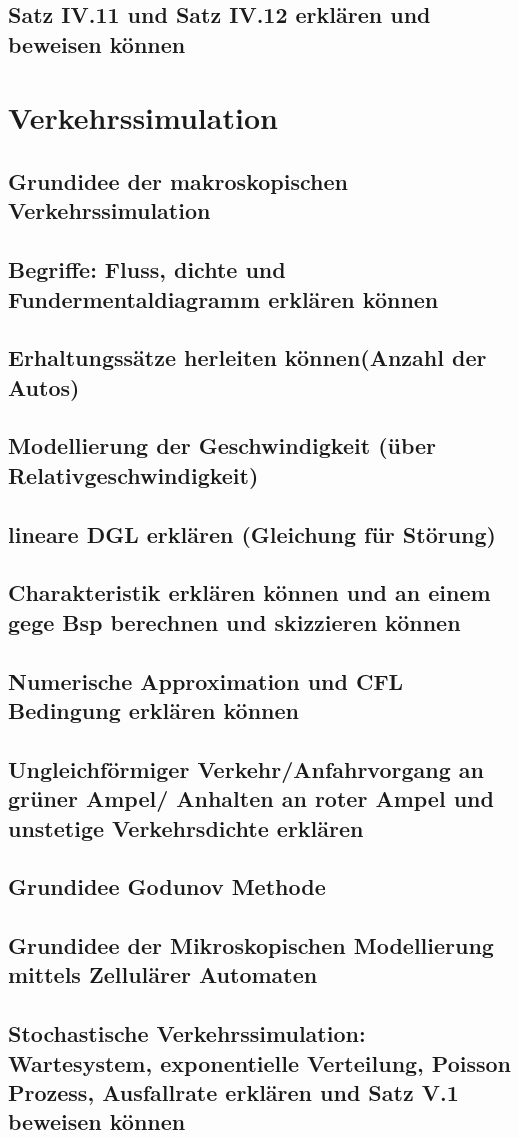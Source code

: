 \documentclass[]{article}
\begin{document}
\subsection*{Satz IV.11 und Satz IV.12 erklären und beweisen können}

\section{Verkehrssimulation}

\subsection*{Grundidee der makroskopischen Verkehrssimulation}

\subsection*{Begriffe: Fluss, dichte und Fundermentaldiagramm erklären können}

\subsection*{Erhaltungssätze herleiten können(Anzahl der Autos)}

\subsection*{Modellierung der Geschwindigkeit (über Relativgeschwindigkeit)}

\subsection*{lineare DGL erklären (Gleichung für Störung)}

\subsection*{Charakteristik erklären können und an einem gege Bsp berechnen und skizzieren können}

\subsection*{Numerische Approximation und CFL Bedingung erklären können}

\subsection*{Ungleichförmiger Verkehr/Anfahrvorgang an grüner Ampel/ Anhalten an roter Ampel und unstetige Verkehrsdichte erklären}

\subsection*{Grundidee Godunov Methode}

\subsection*{Grundidee der Mikroskopischen Modellierung mittels Zellulärer Automaten}

\subsection{Stochastische Verkehrssimulation: Wartesystem, exponentielle Verteilung, Poisson Prozess, Ausfallrate erklären und Satz V.1 beweisen können}
\end{document}
